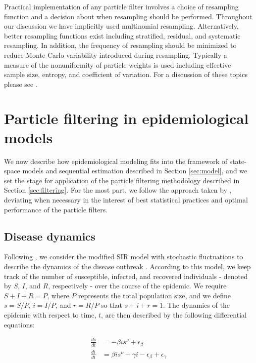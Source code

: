 \documentclass{elsarticle}
\begin{document}
Practical implementation of any particle filter involves a choice of resampling function and a decision about when resampling should be performed. Throughout our discussion we have implicitly used multinomial resampling. Alternatively, better resampling functions exist including stratified, residual, and systematic resampling. In addition, the frequency of resampling should be minimized to reduce Monte Carlo variability introduced during resampling. Typically a measure of the nonuniformity of particle weights is used including effective sample size, entropy, and coefficient of variation. For a discussion of these topics please see \cite{Douc:Capp:Moul:comp:2005}.

\section{Particle filtering in epidemiological models \label{sec:apply}}

We now describe how epidemiological modeling fits into the framework of state-space models and sequential estimation described in Section \ref{sec:model}, and we set the stage for application of the particle filtering methodology described in Section \ref{sec:filtering}.  For the most part, we follow the approach taken by \citet{skvortsov2012monitoring}, deviating when necessary in the interest of best statistical practices and optimal performance of the particle filters.

\subsection{Disease dynamics} \label{sec:dd}

Following \citet{skvortsov2012monitoring}, we consider the modified SIR model with stochastic fluctuations to describe the dynamics of the disease outbreak \citep{herwaarden1995stochepid, dangerfield2009stochepid, anderson2004sars}.  According to this model, we keep track of the number of susceptible, infected, and recovered individuals - denoted by $S$, $I$, and $R$, respectively - over the course of the epidemic.  We require $S + I + R = P$, where $P$ represents the total population size, and we define $s = S/P$, $i = I/P$, and $r = R/P$ so that $s + i + r = 1$.  The dynamics of the epidemic with respect to time, $t$, are then described by the following differential equations:

\begin{align}
\frac{ds}{dt} &= -\beta is^\nu + \epsilon_\beta \label{eqn:dsdt} \\
\frac{di}{dt} &= \beta is^\nu - \gamma i - \epsilon_\beta + \epsilon_\gamma \label{eqn:didt}
\end{align}
\end{document}
